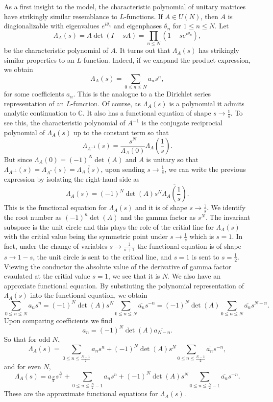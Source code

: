 \documentclass[12pt]{book}
\theoremstyle{definition}\newframedtheorem{method}{Method}
\newcommand{\C}{\mathbb{C}}
\renewcommand{\t}{\theta}
\renewcommand{\L}{\Lambda}
\newcommand{\<}{\langle}
\renewcommand{\>}{\rangle}
\newcommand{\conj}{\overline}
\begin{document}
      As a first insight to the model, the characteristic polynomial of unitary matrices have strikingly similar resemblance to $L$-functions. If $A \in U(N)$, then $A$ is diagionalizable with eigenvalues $e^{i\t_{n}}$ and eigenphases $\t_{n}$ for $1 \le n \le N$. Let
      \[
        \L_{A}(s) = A\det(I-sA) = \prod_{n \le N}(1-se^{i\t_{n}}),
      \]
      be the characteristic polynomial of $A$. It turns out that $\L_{A}(s)$ has strikingly similar properties to an $L$-function. Indeed, if we exapand the product expression, we obtain
      \[
        \L_{A}(s) = \sum_{0 \le n \le N}a_{n}s^{n},
      \]
      for some coefficients $a_{n}$. This is the analogue to a the Dirichlet series representation of an $L$-function. Of course, as $\L_{A}(s)$ is a polynomial it admits analytic continuation to $\C$. It also has a functional equation of shape $s \to \frac{1}{s}$. To see this, the characteristic polynomial of $A^{-1}$ is the conjugate reciprocial polynomial of $\L_{A}(s)$ up to the constant term so that
      \[
        \L_{A^{-1}}(s) = \frac{s^{N}}{\L_{A}(0)}\L_{A}\left(\frac{1}{s}\right).
      \]
      But since $\L_{A}(0) = (-1)^{N}\det(A)$ and $A$ is unitary so that $\L_{A^{-1}}(s) = \L_{A^{\ast}}(s) = \conj{\L_{A}(s)}$, upon sending $s \to \frac{1}{s}$, we can write the previous expression by isolating the right-hand side as
      \[
        \L_{A}(s) = (-1)^{N}\det(A)s^{N}\conj{\L_{A}\left(\frac{1}{s}\right)}.
      \]
      This is the functional equation for $\L_{A}(s)$ and it is of shape $s \to \frac{1}{s}$. We identify the root number as $(-1)^{n}\det(A)$ and the gamma factor as $s^{N}$. The invariant subspace is the unit circle and this plays the role of the critial line for $\L_{A}(s)$ with the critial value being the symmetric point under $s \to \frac{1}{s}$ which is $s = 1$. In fact, under the change of variables $s \to \frac{1}{s+1}$ the functional equation is of shape $s \to 1-s$, the unit circle is sent to the critical line, and $s = 1$ is sent to $s = \frac{1}{2}$. Viewing the conductor the absolute value of the derivative of gamma factor evaulated at the critial value $s = 1$, we see that it is $N$. We also have an approxiate functional equation. By substiuting the polynomial representation of $\L_{A}(s)$ into the functional equation, we obtain
      \[
        \sum_{0 \le n \le N}a_{n}s^{n} = (-1)^{N}\det(A)s^{N}\sum_{0 \le n \le N}\conj{a_{n}}s^{-n} = (-1)^{N}\det(A)\sum_{0 \le n \le N}\conj{a_{n}}s^{N-n}.
      \]
      Upon comparing coefficients we find
      \[
        a_{n} = (-1)^{N}\det(A)\conj{a_{N-n}}.
      \]
      So that for odd $N$,
      \[
        \L_{A}(s) = \sum_{0 \le n \le \frac{N-1}{2}}a_{n}s^{n}+(-1)^{N}\det(A)s^{N}\sum_{0 \le n \le \frac{N-1}{2}}\conj{a_{n}}s^{-n},
      \]
      and for even $N$,
      \[
        \L_{A}(s) = a_{\frac{N}{2}}s^{\frac{N}{2}}+\sum_{0 \le n \le \frac{N}{2}-1}a_{n}s^{n}+(-1)^{N}\det(A)s^{N}\sum_{0 \le n \le \frac{N}{2}-1}\conj{a_{n}}s^{-n}.
      \]
      These are the approximate functional equations for $\L_{A}(s)$.
\end{document}
